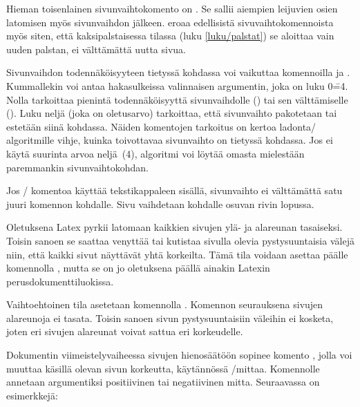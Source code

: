 Hieman toisenlainen sivunvaihtokomento on . Se sallii
aiempien leijuvien osien latomisen myös sivunvaihdon jälkeen.
 eroaa edellisistä sivuvaihtokomennoista myös siten,
että kaksipalstaisessa tilassa (luku \ref{luku/palstat}) se aloittaa
vain uuden palstan, ei välttämättä uutta sivua.

Sivunvaihdon todennäköisyyteen tietyssä kohdassa voi vaikuttaa
komennoilla  ja . Kummallekin
voi antaa hakasulkeissa valinnaisen argumentin, joka on luku 0\==4.
Nolla tarkoittaa pienintä todennäköisyyttä sivunvaihdolle
() tai sen välttämiselle
(). Luku neljä (joka on oletusarvo)
tarkoittaa, että sivunvaihto pakotetaan tai estetään siinä kohdassa.
Näiden komentojen tarkoitus on kertoa ladonta\-/ algoritmille vihje,
kuinka toivottavaa sivunvaihto on tietyssä kohdassa. Jos ei käytä
suurinta arvoa neljä~(4), algoritmi voi löytää omasta mielestään
paremmankin sivunvaihtokohdan.

\begin{koodilohkosis}
\pagebreak[3]  %
\nopagebreak   %
\end{koodilohkosis}

\noindent
Jos \-/ komentoa käyttää tekstikappaleen sisällä,
sivunvaihto ei välttämättä satu juuri komennon kohdalle. Sivu vaihdetaan
kohdalle osuvan rivin lopussa.

Oletuksena Latex pyrkii latomaan kaikkien sivujen ylä- ja alareunan
tasaiseksi. Toisin sanoen se saattaa venyttää tai kutistaa sivulla
olevia pystysuuntaisia välejä niin, että kaikki sivut näyttävät yhtä
korkeilta. Tämä tila voidaan asettaa päälle komennolla
, mutta se on jo oletuksena päällä ainakin Latexin
perusdokumenttiluokissa.

Vaihtoehtoinen tila asetetaan komennolla .
Komennon seurauksena sivujen alareunoja ei tasata. Toisin sanoen sivun
pystysuuntaisiin väleihin ei kosketa, joten eri sivujen alareunat voivat
sattua eri korkeudelle.

Dokumentin viimeistelyvaiheessa sivujen hienosäätöön sopinee komento
, jolla voi muuttaa käsillä olevan sivun
korkeutta, käytännössä \-/mittaa. Komennolle annetaan
argumentiksi positiivinen tai negatiivinen mitta. Seuraavassa on
esimerkkejä:

